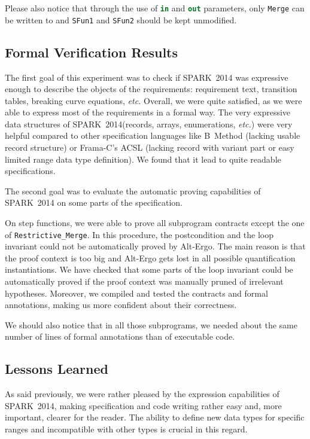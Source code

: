 \documentclass[10pt,a4paper,twocolumn]{article}
\newcommand{\newspark}{SPARK~2014\xspace}
\newcommand{\altergo}{Alt-Ergo\xspace}
\newcommand{\etc}{\textit{etc.}\xspace}
\newcommand{\SPARK}[1]{\lstinline[language=Ada,basicstyle={\footnotesize
      \sffamily},framesep=0pt]$#1$}
\begin{document}
Please also notice that through the use of \SPARK{in} and \SPARK{out}
parameters, only \SPARK{Merge} can be written to and \SPARK{SFun1} and
\SPARK{SFun2} should be kept unmodified.

\subsection{Formal Verification Results}

The first goal of this experiment was to check if \newspark was
expressive enough to describe the objects of the requirements:
requirement text, transition tables, breaking curve equations, \etc
Overall, we were quite satisfied, as we were able to express most of
the requirements in a formal way. The very expressive data structures
of \newspark (records, arrays, enumerations, \etc) were very helpful
compared to other specification languages like B~Method\cite{b-book}
(lacking usable record structure) or Frama-C's ACSL\cite{acsl}
(lacking record with variant part or easy limited range data type
definition). We found that it lead to quite readable specifications.

The second goal was to evaluate the automatic proving capabilities of \newspark
on some parts of the specification.

On step functions, we were able to prove all subprogram
contracts except the one of \SPARK{Restrictive_Merge}. In this procedure, the
postcondition and the loop invariant could not be automatically
proved by \altergo. The main reason is that the proof context is too
big and \altergo gets lost in all possible quantification
instantiations. We have checked that some parts of the loop invariant
could be automatically proved if the proof context was manually pruned
of irrelevant hypotheses. Moreover, we compiled and tested the
contracts and formal annotations, making us more confident about their
correctness.

We should also notice that in all those subprograms, we needed about
the same number of lines of formal annotations than of executable
code.

\subsection{Lessons Learned}

As said previously, we were rather pleased by the expression
capabilities of \newspark, making specification and code writing
rather easy and, more important, clearer for the reader. The ability
to define new data types for specific ranges and incompatible with
other types is crucial in this regard.
\end{document}
